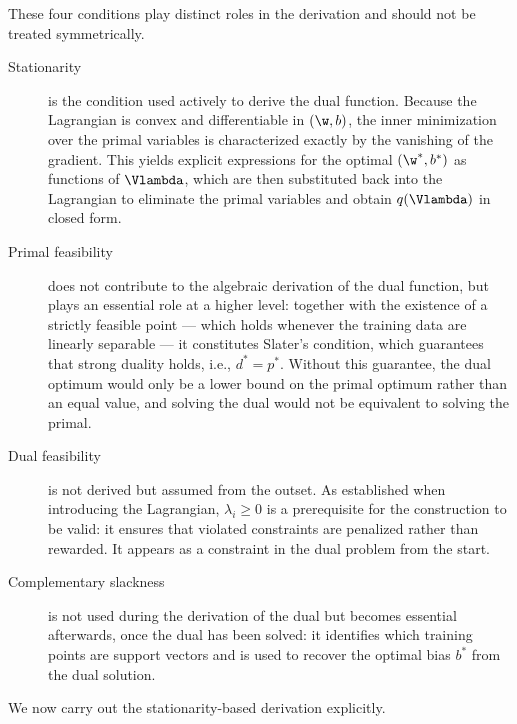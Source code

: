 These four conditions play distinct roles in the derivation and should not be treated
symmetrically.
\begin{description}
\item[Stationarity] is the condition used actively to derive the dual
function. Because the Lagrangian is convex and differentiable in $(\w, b)$, the inner
minimization over the primal variables is characterized exactly by the vanishing of the
gradient. This yields explicit expressions for the optimal $(\w^*, b^*)$ as functions of
$\Vlambda$, which are then substituted back into the Lagrangian to eliminate the primal
variables and obtain $q(\Vlambda)$ in closed form.

\item[Primal feasibility] does not contribute to the algebraic derivation
of the dual function, but plays an essential role at a higher level: together with the
existence of a strictly feasible point --- which holds whenever the training data are
linearly separable --- it constitutes Slater's condition, which guarantees that strong
duality holds, i.e., $d^* = p^*$. Without this guarantee, the dual optimum would only be a
lower bound on the primal optimum rather than an equal value, and solving the dual would not
be equivalent to solving the primal.

\item[Dual feasibility] is not derived but assumed from the outset. As
established when introducing the Lagrangian, $\lambda_i \ge 0$ is a prerequisite for the
construction to be valid: it ensures that violated constraints are penalized rather than
rewarded. It appears as a constraint in the dual problem from the start.

\item[Complementary slackness] is not used during the derivation of the
dual but becomes essential afterwards, once the dual has been solved: it identifies which
training points are support vectors and is used to recover the optimal bias $b^*$ from the
dual solution.
\end{description}
We now carry out the stationarity-based derivation explicitly.

